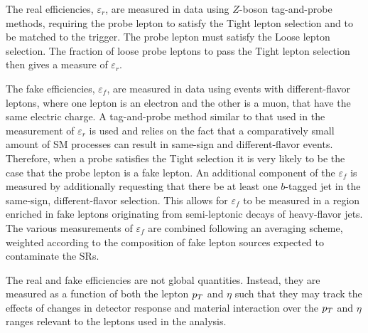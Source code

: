 The real efficiencies, $\varepsilon_r$, are measured in data using $Z$-boson tag-and-probe methods, requiring the probe lepton
to satisfy the Tight lepton selection and to be matched to the trigger.
The probe lepton must satisfy the Loose lepton selection.
The fraction of loose probe leptons to pass the Tight lepton selection then gives a measure of $\varepsilon_r$.

The fake efficiencies, $\varepsilon_f$, are measured in data using events with different-flavor leptons,
where one lepton is an electron and the other is a muon, that have the same electric charge.
A tag-and-probe method similar to that used in the measurement of $\varepsilon_r$ is used
and relies on the fact that a comparatively small amount of SM processes can result in same-sign
and different-flavor events.
Therefore, when a probe satisfies the Tight selection it is very likely to be the case that the
probe lepton is a fake lepton.
An additional component of the $\varepsilon_f$ is measured by additionally requesting that there
be at least one $b$-tagged jet in the same-sign, different-flavor selection.
This allows for $\varepsilon_f$ to be measured in a region enriched in fake leptons originating
from semi-leptonic decays of heavy-flavor jets.
The various measurements of $\varepsilon_f$ are combined following an averaging scheme, weighted according
to the composition of fake lepton sources expected to contaminate the SRs.

The real and fake efficiencies are not global quantities.
Instead, they are measured as a function of both the lepton $p_{T}$ and $\eta$
such that they may track the effects of changes in detector response and
material interaction over the $p_{T}$ and $\eta$ ranges relevant to the leptons used in the analysis.

